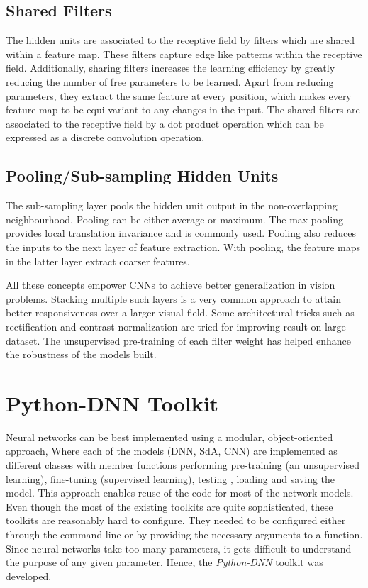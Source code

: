 \subsection{Shared Filters}
The hidden units are associated to the receptive field by filters which are shared within a feature map. These filters capture edge like patterns within the receptive field.  Additionally, sharing filters increases the learning efficiency by greatly reducing the number of free parameters to be learned.  Apart from reducing parameters, they extract the same feature at every position, which makes every feature map to be equi-variant to any changes in the input.  The shared filters are associated to the receptive field by a dot product operation which can be expressed as a discrete convolution operation.
\subsection{Pooling/Sub-sampling Hidden Units}
The sub-sampling layer pools the hidden unit output in the non-overlapping neighbourhood.  Pooling can be either average or maximum.  The max-pooling provides local translation invariance and is commonly used.  Pooling also reduces the inputs to the next layer of feature extraction.  With pooling, the feature maps in the latter layer extract coarser features.

\par All these concepts empower CNNs to achieve better generalization in vision problems.  Stacking multiple such layers is a very common approach to attain better responsiveness over a larger visual field.  Some architectural tricks such as rectification and contrast normalization are tried for improving result on large dataset.  The unsupervised pre-training of each filter weight has helped enhance the robustness of the models built.

\section{Python-DNN Toolkit}
\label{sec:pyDNN}
Neural networks can be best implemented using a modular, object-oriented approach,  Where each of the models (DNN, SdA, CNN) are implemented as different classes with member functions performing pre-training (an unsupervised learning), fine-tuning (supervised learning), testing , loading and saving the model.  This approach enables reuse of the code for most of the network models.  Even though the most of the existing toolkits are quite sophisticated, these toolkits are reasonably hard to configure. They needed to be configured either through the command line or by providing the necessary arguments to a function.  Since neural networks take too many parameters, it gets difficult to understand the purpose of any given parameter.  Hence, the \textit{Python-DNN} toolkit was developed.  
